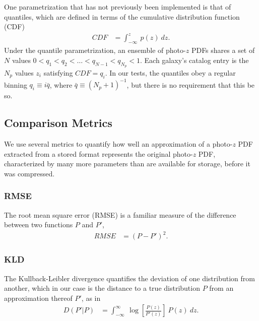 \documentclass[\docopts]{\docclass}
\begin{document}
One parametrization that has not previously been implemented is that of 
quantiles, which are defined in terms of the cumulative distribution function 
(CDF)
\begin{align}
  \label{eq:cdf}
  CDF &= \int_{-\infty}^{z}\ p(z)\ dz.
\end{align}
Under the quantile parametrization, an ensemble of photo-$z$ PDFs shares a set 
of $N$ values $0<q_{1}<q_{2}<\dots<q_{N-1}<q_{N_{p}}<1$.  Each galaxy's catalog 
entry is the $N_{p}$ values $z_{i}$ satisfying $CDF=q_{i}$.  In our tests, the 
quantiles obey a regular binning $q_{i}\equiv i\bar{q}$, where 
$\bar{q}\equiv(N_{p}+1)^{-1}$, but there is no requirement that this be so.

\subsection{Comparison Metrics}
\label{sec:metrics}


We use several metrics to quantify how well an approximation of a photo-$z$ PDF 
extracted from a stored format represents the original photo-$z$ PDF, 
characterized by many more parameters than are available for storage, before it 
was compressed.



\subsubsection{RMSE}
\label{sec:rms}

The root mean square error (RMSE) is a familiar measure of the difference 
between two functions $P$ and $P'$,
\begin{align}
  \label{eq:rmse}
  RMSE &= (P - P')^{2}.
\end{align}

\subsubsection{KLD}
\label{sec:kld}

The Kullback-Leibler divergence quantifies the deviation of one distribution 
from another, which in our case is the distance to a true distribution $P$ from 
an approximation thereof $P'$, as in
\begin{align}
  \label{eq:kld}
  D(P' | P) &= \int_{-\infty}^{\infty}\ \log\left[\frac{P(z)}{P'(z)}\right]\ 
P(z)\ dz.
\end{align}
\end{document}
